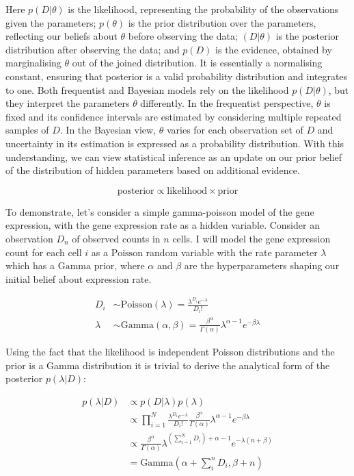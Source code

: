 Here $p({D}|\theta)$ is the likelihood, representing the probability of the observations given the parameters; $p(\theta)$ is the prior distribution over the parameters, reflecting our beliefs about $\theta$ before observing the data; $({D}| \theta)$ is the posterior distribution after observing the data; and $p({D})$ is the evidence, obtained by marginalising $\theta$ out of the joined distribution. It is essentially a normalising constant, ensuring that posterior is a valid probability distribution and integrates to one. 
Both frequentist and Bayesian models rely on the likelihood $p({D}|\theta)$, but they interpret the parameters $\theta$ differently. In the frequentist perspective, $\theta$ is fixed and its confidence intervals are estimated by considering multiple repeated samples of ${D}$. In the Bayesian view, $\theta$ varies for each observation set of ${D}$ and uncertainty in its estimation is expressed as a probability distribution. With this understanding, we can view statistical inference as an update on our prior belief of the distribution of hidden parameters based on additional evidence.

\begin{equation}
\text{posterior} \propto \text{likelihood} \times \text{prior}
\end{equation}

To demonstrate, let’s consider a simple gamma-poisson model of the gene expression, with the gene expression rate as a hidden variable. Consider an observation $D_n$  of observed counts in $n$ cells. I will model the gene expression count for each cell $i$ as a $\text{Poisson}$ random variable with the rate parameter $\lambda$ which has a $\text{Gamma}$ prior, where $\alpha$ and $\beta$ are the hyperparameters shaping our initial belief about expression rate.

\begin{align}
    D_i & \sim \text{Poisson}(\lambda) = \frac{\lambda^{D_i} e^{-\lambda}}{D_i!} \\
    \lambda & \sim \text{Gamma}(\alpha, \beta) = \frac{\beta^\alpha}{\Gamma(\alpha)} \lambda^{\alpha - 1} e^{-\beta \lambda}
\end{align}
    
Using the fact that the likelihood is independent Poisson distributions and the prior is a Gamma distribution it is trivial to derive the analytical form of the posterior $p(\lambda|D)$:

\begin{align}
        p(\lambda|D) & \propto p(D|\lambda) p(\lambda) \\
         & \propto \prod_{i=1}^N \frac{\lambda^{D_i} e^{-\lambda}}{D_i!} \frac{\beta^\alpha}{\Gamma(\alpha)} \lambda^{\alpha - 1} e^{-\beta \lambda} \\ 
        & \propto  \frac{\beta^\alpha}{\Gamma(\alpha)} \lambda^{\left(\sum_{i=1}^N D_i\right) + \alpha - 1} e^{-\lambda(n+\beta)} \\
         & = \text{Gamma}(\alpha + \sum_i^n D_i, \beta + n)
        \label{eq:simple-gamma-poisson}
\end{align}

